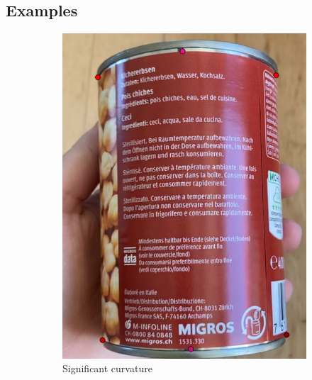 \documentclass[a4paper,11pt]{report}
\begin{document}
            \subsection{Examples}
                \begin{figure}[h]
                    \centering
                    \begin{subfigure}{0.45\textwidth}
                        \centering
                        \includegraphics[width=\textwidth]{full_image_example_1.png}
                        \caption{Significant curvature}
                        \label{fig:full_image_example_1}
                    \end{subfigure}
                    \hfill
                    \begin{subfigure}{0.45\textwidth}
                        \centering

\end{subfigure}
\end{figure}
\end{document}
